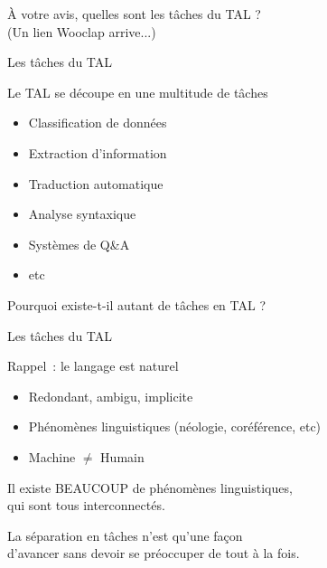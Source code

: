 \documentclass[serif, aspectratio=169]{beamer}
\begin{document}
\begin{exoframe}{}
    \begin{center}
        \Large
        À votre avis, quelles sont les tâches du TAL ? \\
        (Un lien Wooclap arrive...)
    \end{center}
\end{exoframe}

\begin{frame}{Les tâches du TAL}
    \begin{block}{Le TAL se découpe en une multitude de tâches}
        \begin{itemize}
            \item Classification de données
            \item Extraction d'information
            \item Traduction automatique
            \item Analyse syntaxique
            \item Systèmes de Q\&A
            \item etc
        \end{itemize}
    \end{block}
    \pause
    \begin{center}
        \Large
        Pourquoi existe-t-il autant de tâches en TAL ?
    \end{center}
\end{frame}

\begin{frame}{Les tâches du TAL}
    \begin{block}{Rappel~: le langage est naturel}
        \begin{itemize}
            \pause
            \item Redondant, ambigu, implicite
            \pause
            \item Phénomènes linguistiques (néologie, coréférence, etc)
            \pause
            \item Machine $\neq$ Humain
        \end{itemize}
    \end{block}
    \pause
    \vspace{10pt}
        \begin{center}
        \Large
         Il existe BEAUCOUP de phénomènes linguistiques, \\
         qui sont tous interconnectés.
    \end{center}
    \pause
    \begin{center}
        \Large
         La séparation en tâches n'est qu'une façon \\ d'avancer sans devoir se préoccuper de tout à la fois.
    \end{center}
\end{frame}
\end{document}
